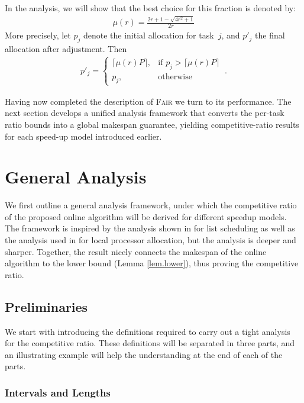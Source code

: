 \documentclass{article}
\newcommand\fair{\textsc{Fair}\xspace}
\newcommand\rratio{r\xspace}
\begin{document}
In the analysis, we will show that the best choice for this fraction is denoted by:
\begin{align}
\label{eq.muR}
\mu(\rratio)=\frac{2\rratio+1-\sqrt{4\rratio^2+1}}{2\rratio}
\end{align}
More precisely, let $p_j$ denote the initial allocation for task~$j$, and $p'_j$ the final allocation after adjustment. Then
\begin{align}
\label{eq.adjust}
p'_j = \begin{cases}
\lceil \mu(\rratio) P \rceil,  & \text{if } p_j > \lceil \mu(\rratio) P \rceil \\
p_j, & \text{otherwise}
\end{cases} \ .
\end{align}

Having now completed the description of \fair we turn to its performance. The next section develops a unified analysis framework that converts the per-task ratio bounds into a global makespan guarantee, yielding competitive-ratio results for each speed-up model introduced earlier.

\section{General Analysis}\label{sec.analysis}

We first outline a general analysis framework, under which the competitive ratio of the proposed online algorithm will be derived for different speedup models.
The framework is inspired by the analysis shown in \cite{Lepere01_DAG, Jansen06_DAG, Jansen05_concave} for list scheduling as well as the analysis used in \cite{ICPP22, TOPC24} for local processor allocation, but the analysis is deeper and sharper. Together, the result nicely connects the makespan of the online algorithm to the lower bound (Lemma \ref{lem.lower}), thus proving the competitive ratio.

\subsection{Preliminaries}



We start with introducing the definitions required to carry out a tight analysis for the competitive ratio. These definitions will be separated in three parts, and an illustrating example will help the understanding at the end of each of the parts.


\subsubsection{Intervals and Lengths} 
\end{document}
